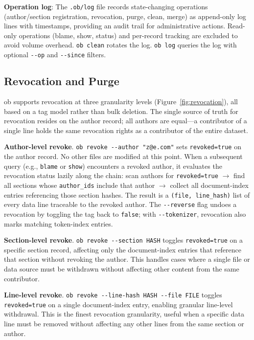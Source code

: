 \textbf{Operation log}: The \texttt{.ob/log} file records state-changing operations (author/section registration, revocation, purge, clean, merge) as append-only log lines with timestamps, providing an audit trail for administrative actions. Read-only operations (blame, show, status) and per-record tracking are excluded to avoid volume overhead. \texttt{ob clean} rotates the log. \texttt{ob log} queries the log with optional \texttt{-{}-op} and \texttt{-{}-since} filters.

\subsection{Revocation and Purge}

ob supports revocation at three granularity levels (Figure~\ref{fig:revocation}), all based on a tag model rather than bulk deletion. The single source of truth for revocation resides on the author record; all authors are equal---a contributor of a single line holds the same revocation rights as a contributor of the entire dataset.

\textbf{Author-level revoke}. \texttt{ob revoke -{}-author "z@e.com"} sets \texttt{revoked=true} on the author record. No other files are modified at this point. When a subsequent query (e.g., \texttt{blame} or \texttt{show}) encounters a revoked author, it evaluates the revocation status lazily along the chain: scan authors for \texttt{revoked=true} $\rightarrow$ find all sections whose \texttt{author\_ids} include that author $\rightarrow$ collect all document-index entries referencing those section hashes. The result is a \texttt{(file, line\_hash)} list of every data line traceable to the revoked author. The \texttt{-{}-reverse} flag undoes a revocation by toggling the tag back to \texttt{false}; with \texttt{-{}-tokenizer}, revocation also marks matching token-index entries.

\textbf{Section-level revoke}. \texttt{ob revoke -{}-section HASH} toggles \texttt{revoked=true} on a specific section record, affecting only the document-index entries that reference that section without revoking the author. This handles cases where a single file or data source must be withdrawn without affecting other content from the same contributor.

\textbf{Line-level revoke}. \texttt{ob revoke -{}-line-hash HASH -{}-file FILE} toggles \texttt{revoked=true} on a single document-index entry, enabling granular line-level withdrawal. This is the finest revocation granularity, useful when a specific data line must be removed without affecting any other lines from the same section or author.

